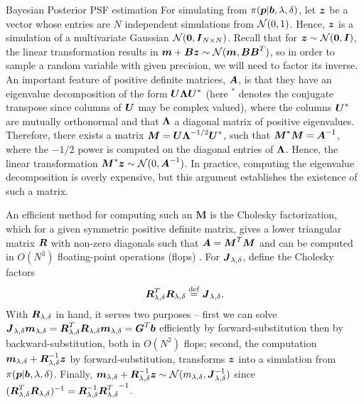 \begin{chapter}{Bayesian Posterior PSF estimation}
For simulating from $\pi(\mbox{\boldmath$p$}|\mbox{\boldmath$b$}, \lambda,\delta)$, let $\mbox{\boldmath$z$}$ be a vector whose entries are $N$ independent simulations from $\mathcal{N}(0,1)$. 
Hence, $\mbox{\boldmath$z$}$ is a simulation of a multivariate Gaussian $\mathcal{N}(\mbox{\boldmath$0$},\mbox{\boldmath$I$}_{N\times N})$.
Recall that for $\mbox{\boldmath$z$} \sim \mathcal{N}(\mbox{\boldmath$0$},\mbox{\boldmath$I$})$, the linear transformation results in $\mbox{\boldmath$m$} + \mbox{\boldmath$B$} \mbox{\boldmath$z$} \sim \mathcal{N}(\mbox{\boldmath$m$}, \mbox{\boldmath$B$}\mbox{\boldmath$B$}^T)$, so in order to sample a random variable with given precision, we will need to factor its inverse.
An important feature of positive definite matrices, $\mbox{\boldmath$A$}$, is that they have an eigenvalue decomposition of the form $\mbox{\boldmath$U$} \mbox{\boldmath$\Lambda$} \mbox{\boldmath$U$}^*$ (here $^*$ denotes the conjugate transpose since columns of $\mbox{\boldmath$U$}$ may be complex valued), where the columns $\mbox{\boldmath$U$}^*$ are mutually orthonormal and that $\mbox{\boldmath$\Lambda$}$ a diagonal matrix of positive eigenvalues.
Therefore, there exists a matrix $\mbox{\boldmath$M$} = \mbox{\boldmath$U$} \mbox{\boldmath$\Lambda$}^{-1/2} \mbox{\boldmath$U$}^*$, such that $\mbox{\boldmath$M$}^*\mbox{\boldmath$M$} = \mbox{\boldmath$A$}^{-1}$, where the $-1/2$ power is computed on the diagonal entries of $\mbox{\boldmath$\Lambda$}$.
Hence, the linear transformation $\mbox{\boldmath$M$}^* \mbox{\boldmath$z$} \sim \mathcal{N}(0,\mbox{\boldmath$A$}^{-1})$.  
In practice, computing the eigenvalue decomposition is overly expensive, but this argument establishes the existence of such a matrix.

An efficient method for computing such an $\bm M$ is the Cholesky factorization, which for a given symmetric positive definite matrix, gives a lower triangular matrix $\mbox{\boldmath$R$}$ with non-zero diagonals such that $\mbox{\boldmath$A$} = \mbox{\boldmath$M$}^T\mbox{\boldmath$M$}$ and can be computed in $O(N^3)$ floating-point operations (flops) \citep{golub2012matrix}.
For $\mbox{\boldmath$J$}_{\lambda,\delta}$, define the Cholesky factors
\begin{equation} \label{eq:choleskyJ}
  \mbox{\boldmath$R$}_{\lambda,\delta}^T\mbox{\boldmath$R$}_{\lambda,\delta} \stackrel{\rm def}{=} \mbox{\boldmath$J$}_{\lambda,\delta}.
\end{equation}
With $\mbox{\boldmath$R$}_{\lambda,\delta}$ in hand, it serves two purposes -- first we can solve $\mbox{\boldmath$J$}_{\lambda,\delta} \mbox{\boldmath$m$}_{\lambda,\delta} = \mbox{\boldmath$R$}_{\lambda,\delta}^T\mbox{\boldmath$R$}_{\lambda,\delta} \mbox{\boldmath$m$}_{\lambda,\delta} = \mbox{\boldmath$G$}^T \mbox{\boldmath$b$}$ efficiently by forward-substitution then by backward-substitution, both in $O(N^2)$ flops; second, the computation $\mbox{\boldmath$m$}_{\lambda,\delta} + \mbox{\boldmath$R$}_{\lambda,\delta}^{-1} \mbox{\boldmath$z$}$ by forward-substitution, transforms $\mbox{\boldmath$z$}$ into a simulation from $\pi(\mbox{\boldmath$p$} | \mbox{\boldmath$b$},\lambda,\delta)$.
Finally, $\mbox{\boldmath$m$}_{\lambda,\delta} + \mbox{\boldmath$R$}_{\lambda,\delta}^{-1}\mbox{\boldmath$z$} \sim \mathcal{N}( m_{\lambda,\delta} , \mbox{\boldmath$J$}_{\lambda,\delta}^{-1})$ since $(\mbox{\boldmath$R$}_{\lambda,\delta}^T \mbox{\boldmath$R$}_{\lambda,\delta})^{-1} =\mbox{\boldmath$R$}_{\lambda,\delta}^{-1} {\mbox{\boldmath$R$}_{\lambda,\delta}^T}^{-1}$.


\end{chapter}
